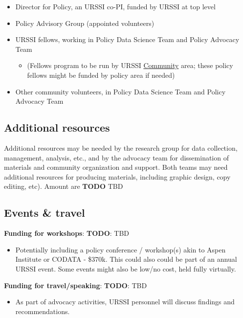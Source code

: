 \documentclass[
]{book}
\providecommand{\tightlist}{%
  \setlength{\itemsep}{0pt}\setlength{\parskip}{0pt}}
\begin{document}
\begin{itemize}
\tightlist
\item
  Director for Policy, an URSSI co-PI, funded by URSSI at top level
\item
  Policy Advisory Group (appointed volunteers)
\item
  URSSI fellows, working in Policy Data Science Team and Policy Advocacy Team

  \begin{itemize}
  \tightlist
  \item
    (Fellows program to be run by URSSI \protect\hyperlink{Ch-Comm}{Community} area; these policy fellows might
    be funded by policy area if needed)
  \end{itemize}
\item
  Other community volunteers, in Policy Data Science Team and Policy Advocacy Team
\end{itemize}

\hypertarget{additional-resources}{%
\subsection{Additional resources}\label{additional-resources}}

Additional resources may be needed by the research group for data collection, management, analysis, etc.,
and by the advocacy team for dissemination of materials and community organization and support.
Both teams may need additional resources for producing materials, including graphic design, copy editing, etc).
Amount are \textbf{TODO} TBD

\hypertarget{events-travel}{%
\subsection{Events \& travel}\label{events-travel}}

\textbf{Funding for workshops}: \textbf{TODO}: TBD

\begin{itemize}
\tightlist
\item
  Potentially including a policy conference / workshop(s) akin to Aspen Institute or CODATA - \$370k.
  This could also could be part of an annual URSSI event. Some events might also be low/no cost, held fully virtually.
\end{itemize}

\textbf{Funding for travel/speaking}: \textbf{TODO}: TBD

\begin{itemize}
\tightlist
\item
  As part of advocacy activities, URSSI personnel will discuss findings and recommendations.
\end{itemize}
\end{document}
